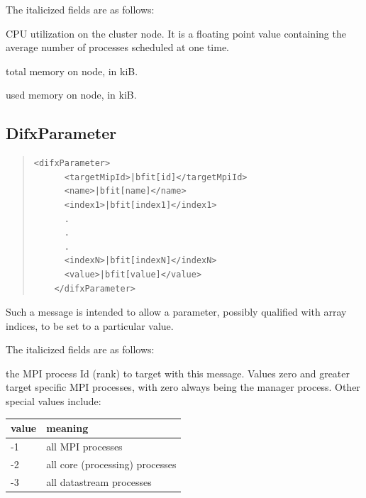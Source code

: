 \begin{description}
\noindent The italicized fields are as follows:

\begin{description}
\item{} CPU utilization on the cluster node.  
It is a floating point value containing the average number of processes scheduled at one time.
\item{} total memory on node, in kiB.
\item{} used memory on node, in kiB.
\end{description}







\subsection{DifxParameter}

\begin{quotation} 
\begin{Verbatim}[commandchars=\|\[\]] 
    <difxParameter>
      <targetMipId>|bfit[id]</targetMpiId>
      <name>|bfit[name]</name>
      <index1>|bfit[index1]</index1>
      .
      .
      .
      <indexN>|bfit[indexN]</indexN>
      <value>|bfit[value]</value>
    </difxParameter>
\end{Verbatim}
\end{quotation}

Such a message is intended to allow a parameter, possibly qualified with array indices, to be set to a particular value.

\noindent The italicized fields are as follows:

\begin{description}
\item{} the MPI process Id (rank) to target with this message.
Values zero and greater target specific MPI processes, with zero always being the manager process.
Other special values include:

\begin{tabular}{ll}
value & meaning \\
\hline
-1 & all MPI processes \\
-2 & all core (processing) processes \\
-3 & all datastream processes \\
\end{tabular}


\end{description}
\end{description}

